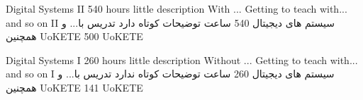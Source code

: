 
\teachingCI
{Digital Systems II}
{540 hours}
{little description With ...}
{Getting to teach with... and so on II}
{سیستم های دیجیتال }
{540 ساعت}
{توضیحات کوتاه دارد}
{تدریس با... و همچنین }
{UoKETE}
\teachingCII
{}
{}
{500}
{UoKETE}

\teachingCI
{Digital Systems I}
{260 hours}
{little description Without ...}
{Getting to teach with... and so on I}
{سیستم های دیجیتال }
{260 ساعت}
{توضیحات کوتاه ندارد}
{تدریس با... و همچنین }
{UoKETE}
\teachingCII
{}
{}
{141}
{UoKETE}
